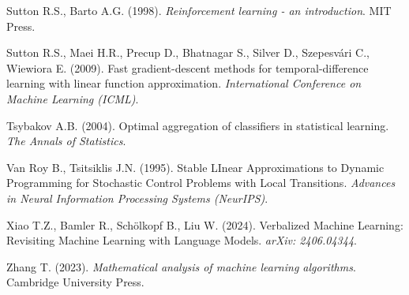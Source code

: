 %
{Sutton R.S., Barto A.G. (1998). \textit{Reinforcement learning - an introduction}. MIT Press.}

%
{Sutton R.S., Maei H.R., Precup D., Bhatnagar S., Silver D., Szepesv{\'a}ri C., Wiewiora E. (2009). Fast gradient-descent methods for temporal-difference learning with linear function approximation. \textit{International Conference on Machine Learning (ICML)}.}

%
{Tsybakov A.B. (2004). Optimal aggregation of classifiers in statistical learning. \textit{The Annals of Statistics}.}

%
{Van Roy B., Tsitsiklis J.N. (1995). Stable LInear Approximations to Dynamic Programming for Stochastic Control Problems with Local Transitions. \textit{Advances in Neural Information Processing Systems (NeurIPS)}.}

%
{Xiao T.Z., Bamler R., Schölkopf B., Liu W. (2024). Verbalized Machine Learning: Revisiting Machine Learning with Language Models. \textit{arXiv: 2406.04344}.}

%
{Zhang T. (2023). \textit{Mathematical analysis of machine learning algorithms}. Cambridge University Press.}

